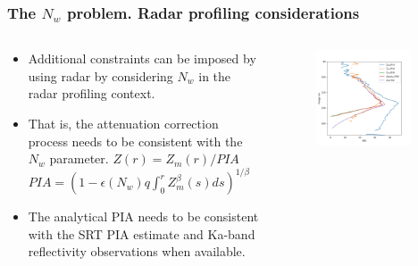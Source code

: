 \documentclass{beamer}
\begin{document}
\begin{frame}
\frametitle{The $N_w$ problem. Radar profiling considerations}
\begin{columns}
    \begin{column}{0.55\textwidth}
    \begin{itemize}
        \item Additional constraints can be imposed by using radar
        by considering $N_w$ in the radar profiling context.
        \item That is, the attenuation correction process needs to be
        consistent with the $N_w$ parameter.
        $Z(r)=Z_m(r) /PIA$
        $PIA=(1-\epsilon (N_w) q\int_0^r Z_m^\beta(s)ds)^{1/\beta}$
        \item The analytical PIA needs to be consistent with the
        SRT PIA estimate and Ka-band reflectivity observations 
        when available.
    \end{itemize}
    \end{column}
    \begin{column}{0.5\textwidth}
        \begin{figure}
            \begin{center}
            \includegraphics[width=0.9\textwidth]{Figures/fig5.png}
            \end{center}
    \end{figure}
    \end{column}
\end{columns}
\end{frame}
\end{document}
